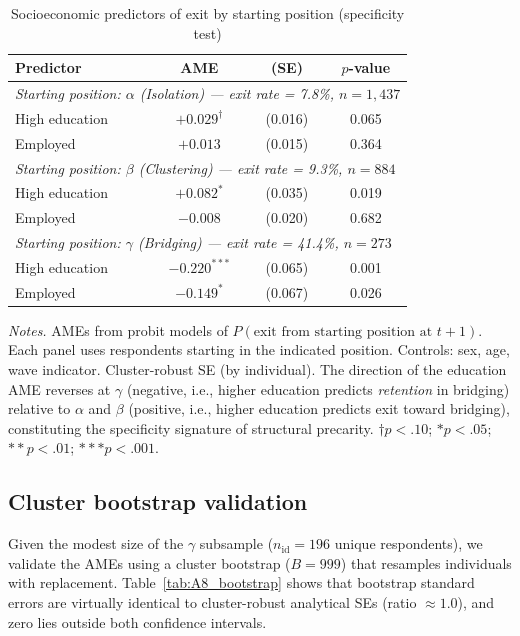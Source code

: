 \documentclass[12pt, a4paper]{article}
\newcommand{\tablenote}[1]{\vspace{4pt}\par\footnotesize\textit{Notes.} #1}
\begin{document}
\begin{table}[H]
\centering
\caption{Socioeconomic predictors of exit by starting position (specificity test)}
\label{tab:A7_specificity}
\small
\begin{tabular}{lccc}
\hline\hline
  Predictor & AME & (SE) & $p$-value \\
\hline
  \multicolumn{4}{l}{\textit{Starting position: $\alpha$ (Isolation) --- exit rate = 7.8\%, $n = 1{,}437$}} \\
\hline
  \quad High education   & $+0.029^{\dagger}$ & (0.016) & 0.065 \\
  \quad Employed         & $+0.013$           & (0.015) & 0.364 \\
\hline
  \multicolumn{4}{l}{\textit{Starting position: $\beta$ (Clustering) --- exit rate = 9.3\%, $n = 884$}} \\
\hline
  \quad High education   & $+0.082^{*}$       & (0.035) & 0.019 \\
  \quad Employed         & $-0.008$           & (0.020) & 0.682 \\
\hline
  \multicolumn{4}{l}{\textit{Starting position: $\gamma$ (Bridging) --- exit rate = 41.4\%, $n = 273$}} \\
\hline
  \quad High education   & $-0.220^{***}$     & (0.065) & 0.001 \\
  \quad Employed         & $-0.149^{*}$       & (0.067) & 0.026 \\
\hline\hline
\end{tabular}
\tablenote{AMEs from probit models of $P(\text{exit from starting position at } t+1)$.
Each panel uses respondents starting in the indicated position.
Controls: sex, age, wave indicator. Cluster-robust SE (by individual).
The direction of the education AME reverses at $\gamma$ (negative, i.e., higher
education predicts \textit{retention} in bridging) relative to $\alpha$ and $\beta$
(positive, i.e., higher education predicts exit toward bridging), constituting
the specificity signature of structural precarity.
$\dagger p<.10$; $* p<.05$; $** p<.01$; $*** p<.001$.}
\end{table}

\subsection{Cluster bootstrap validation}
\label{sec:h3_bootstrap}

Given the modest size of the $\gamma$ subsample ($n_{\text{id}} = 196$
unique respondents), we validate the AMEs using a cluster bootstrap
($B = 999$) that resamples individuals with replacement.
Table~\ref{tab:A8_bootstrap} shows that bootstrap standard errors are
virtually identical to cluster-robust analytical SEs (ratio $\approx 1.0$),
and zero lies outside both confidence intervals.
\end{document}
